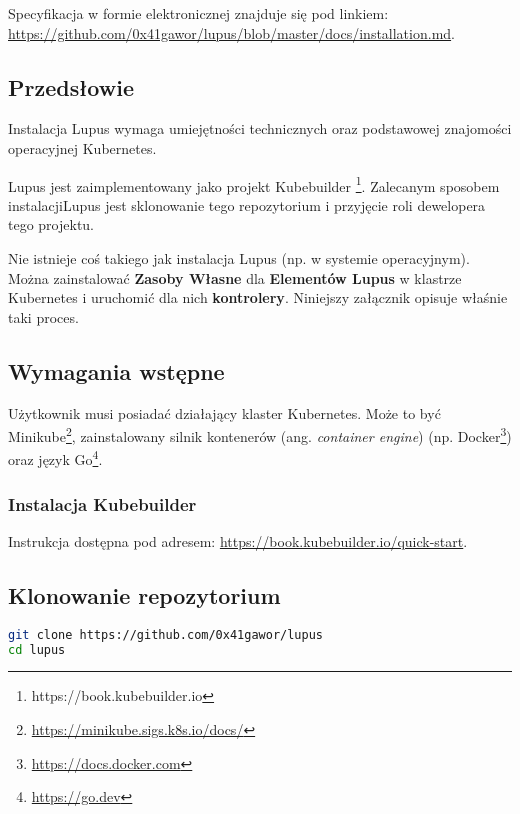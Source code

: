 \label{appendix:2}

Specyfikacja w formie elektronicznej znajduje się pod linkiem: \url{https://github.com/0x41gawor/lupus/blob/master/docs/installation.md}.

\subsection{Przedsłowie}

Instalacja Lupus wymaga umiejętności technicznych oraz podstawowej znajomości operacyjnej Kubernetes.

Lupus jest zaimplementowany jako projekt Kubebuilder \footnote{https://book.kubebuilder.io}. Zalecanym sposobem instalacjiLupus jest sklonowanie tego repozytorium i przyjęcie roli dewelopera tego projektu.

Nie istnieje coś takiego jak instalacja Lupus (np. w systemie operacyjnym). Można zainstalować \textbf{Zasoby Własne} dla \textbf{Elementów Lupus} w klastrze Kubernetes i uruchomić dla nich \textbf{kontrolery}. Niniejszy załącznik opisuje właśnie taki proces.

\subsection{Wymagania wstępne}

Użytkownik musi posiadać działający klaster Kubernetes. Może to być Minikube\footnote{\url{https://minikube.sigs.k8s.io/docs/}}, zainstalowany silnik kontenerów (ang. \textit{container engine}) (np. Docker\footnote{\url{https://docs.docker.com}}) oraz język Go\footnote{\url{https://go.dev}}.

\subsubsection{Instalacja Kubebuilder}

Instrukcja dostępna pod adresem: \url{https://book.kubebuilder.io/quick-start}.

\subsection{Klonowanie repozytorium}

\begin{lstlisting}[language=bash, caption={Klonowanie repozytorium}]
git clone https://github.com/0x41gawor/lupus
cd lupus
\end{lstlisting}

